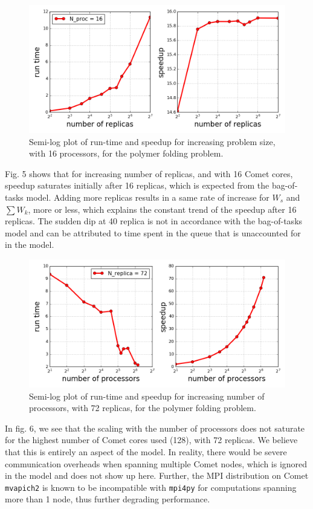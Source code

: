 \documentclass[12pt,letterpaper]{article}
\begin{document}
\begin{figure}[h!]
\centering
\includegraphics[scale=0.5]{artwork/rscale.png}
\caption{Semi-log plot of run-time and speedup for increasing problem size, with 16 processors, for the polymer folding problem.}
\end{figure}

\noindent Fig. 5 shows that for increasing number of replicas, and with 16 Comet cores, speedup saturates initially after 16 replicas, which is expected from the bag-of-tasks model. Adding more replicas results in a same rate of increase for $W_s$ and $\sum W_k$, more or less, which explains the constant trend of the speedup after 16 replicas. The sudden dip at 40 replica is not in accordance with the bag-of-tasks model and can be attributed to time spent in the queue that is unaccounted for in the model.
%
\begin{figure}[h!]
\centering
\includegraphics[scale=0.5]{artwork/pscale.png}
\caption{Semi-log plot of run-time and speedup for increasing number of processors, with 72 replicas, for the polymer folding problem.}
\end{figure}

\noindent In fig. 6, we see that the scaling with the number of processors does not saturate for the highest number of Comet cores used (128), with 72 replicas. We believe that this is entirely an aspect of the model. In reality, there would be severe communication overheads when spanning multiple Comet nodes, which is ignored in the model and does not show up here. Further, the MPI distribution on Comet \texttt{mvapich2} is known to be incompatible with \texttt{mpi4py} for computations spanning more than 1 node, thus further degrading performance.
\end{document}
